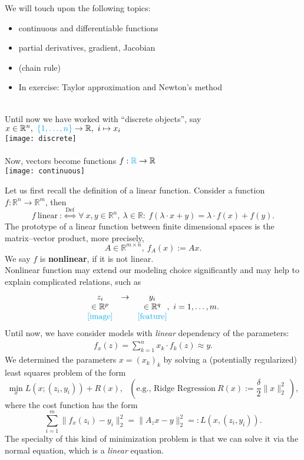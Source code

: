 \color{fontcolor}
\begin{frame}

We will touch upon the following topics:
\begin{itemize}
	\item continuous and differentiable functions
	\item partial derivatives, gradient, Jacobian
	\item (chain rule)
	\item In exercise: Taylor approximation and Newton's method
\end{itemize}
~\\
Until now we have worked with ``discrete objects'', say
$x\in\mathbb{R}^n,~{\color{cyan}\{1,\dots,n\}}\rightarrow\mathbb{R},~i\mapsto x_i$\\
\texttt{[image: discrete]}\\~\\
Now, vectors become functions $f:{\color{cyan}\mathbb{R}}\rightarrow\mathbb{R}$\\
\texttt{[image: continuous]}

\end{frame}

\begin{frame}
Let us first recall the definition of a linear function. Consider a function $f:\mathbb{R}^n\rightarrow\mathbb{R}^m$, then
$$
f~\text{linear}~:\stackrel{\text{Def}}{\Leftrightarrow}~\forall~x,y\in\mathbb{R}^n,~\lambda\in\mathbb{R}:~f(\lambda\cdot x+y)=\lambda\cdot f(x)+f(y).
$$
The prototype of a linear function between finite dimensional spaces is the matrix--vector product, more precisely,
$$
A\in\mathbb{R}^{m\times n},~f_A(x):=Ax.
$$
{\color{defgruen}We say $f$ is \textbf{nonlinear}, if it is not linear.}
~\\
Nonlinear function may extend our modeling choice significantly and may help to explain complicated relations, such as
$$
\begin{matrix}
z_i&\rightarrow&y_i\\
\in\mathbb{R}^p&~&\in\mathbb{R}^q\\
\text{\color{cyan}[image]}&~&\text{\color{cyan}[feature]}
\end{matrix},~i=1,\dots,m.
$$
Until now, we have consider models with \textit{linear} dependency of the parameters:
\begin{align*}
f_x(z)=\sum_{k=1}^nx_k\cdot f_k(z)\approx y.
\end{align*}
We determined the parameters $x=(x_k)_k$ by solving a (potentially regularized) least squares problem of the form
$$
\min_x L(x;(z_i,y_i))+R(x),~~~\left(\text{e.g., Ridge Regression}~R(x):=\frac{\delta}{2}\|x\|_2^2~\right),
$$
where the cost function has the form
$$\sum_{i=1}^m\|f_x(z_i)-y_i\|_2^2=\|A_zx-y\|_2^2=:L(x,(z_i,y_i)).$$
The specialty of this kind of minimization problem is that we can solve it via the normal equation, which is a \textit{linear} equation.
\end{frame} 

